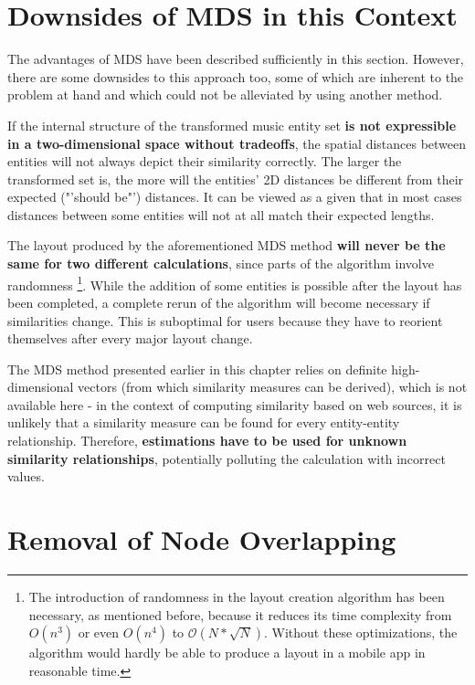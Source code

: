\section{Downsides of MDS in this Context}

The advantages of MDS have been described sufficiently in this section. However, there are some downsides to this approach too, some of which are inherent to the problem at hand and which could not be alleviated by using another method.

If the internal structure of the transformed music entity set \textbf{is not expressible in a two-dimensional space without tradeoffs}, the spatial distances between entities will not always depict their similarity correctly. The larger the transformed set is, the more will the entities' 2D distances be different from their expected ("'should be"') distances. It can be viewed as a given that in most cases distances between some entities will not at all match their expected lengths.

The layout produced by the aforementioned MDS method \textbf{will never be the same for two different calculations}, since parts of the algorithm involve randomness 
\footnote{The introduction of randomness in the layout creation algorithm has been necessary, as mentioned before, because it reduces its time complexity from $O(n^3)$ or even $O(n^4)$ to $\mathcal O(N*\sqrt{N})$. Without these optimizations, the algorithm would hardly be able to produce a layout in a mobile app in reasonable time.}.
While the addition of some entities is possible after the layout has been completed, a complete rerun of the algorithm will become necessary if similarities change. This is suboptimal for users because they have to reorient themselves after every major layout change.

The MDS method presented earlier in this chapter relies on definite high-dimensional vectors (from which similarity measures can be derived), which is not available here - in the context of computing similarity based on web sources, it is unlikely that a similarity measure can be found for every entity-entity relationship. Therefore, \textbf{estimations have to be used for unknown similarity relationships}, potentially polluting the calculation with incorrect values.

\section{Removal of Node Overlapping}
\label{sec:removal-node-overlapping}

